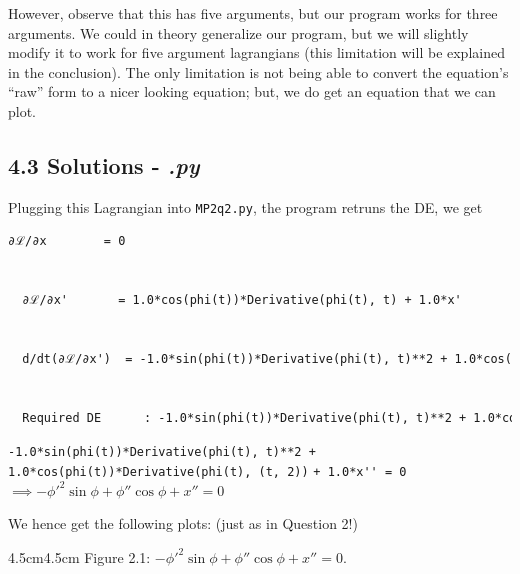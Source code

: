 \documentclass[hidelinks, 11pt]{article}
\begin{document}
\noindent However, observe that this has five arguments, but our program works for three arguments. We could in theory generalize our program, but we will slightly modify it to work for five argument lagrangians (this limitation will be explained in the conclusion). The only limitation is not being able to convert the equation's ``raw'' form to a nicer looking equation; but, we do get an equation that we can plot.


\subsection*{4.3 Solutions - \emph{.py}}

Plugging this Lagrangian into \verb|MP2q2.py|, the program retruns the DE, we get 

\begin{lstlisting}[language = html]
  ∂ℒ/∂x        = 0


  ∂ℒ/∂x'       = 1.0*cos(phi(t))*Derivative(phi(t), t) + 1.0*x'
  
  
  d/dt(∂ℒ/∂x')  = -1.0*sin(phi(t))*Derivative(phi(t), t)**2 + 1.0*cos(phi(t))*Derivative(phi(t), (t, 2)) + 1.0*x''
  
  
  Required DE      : -1.0*sin(phi(t))*Derivative(phi(t), t)**2 + 1.0*cos(phi(t))*Derivative(phi(t), (t, 2)) + 1.0*x'' = 0
\end{lstlisting} 

\noindent \verb|-1.0*sin(phi(t))*Derivative(phi(t), t)**2 + 1.0*cos(phi(t))*Derivative(phi(t), (t, 2))|
\verb|+ 1.0*x'' = 0| \\
$\implies -\phi'^2\sin{\phi} + \phi''\cos{\phi} + x'' = 0$

We hence get the following plots: (just as in Question 2!)

\begin{center}
\begin{changemargin}{4.5cm}{4.5cm}  
  Figure 2.1: $-\phi'^2\sin{\phi} + \phi''\cos{\phi} + x'' = 0$.
\end{changemargin}
\end{center}
\end{document}
